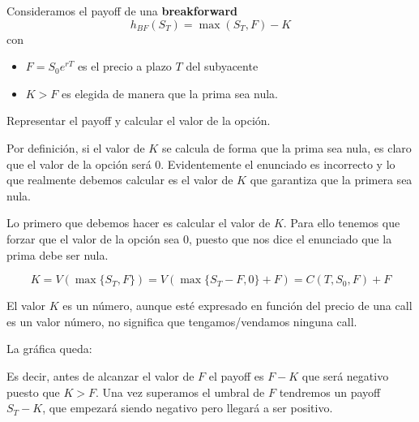 \begin{problem}[4]
Consideramos el payoff de una \textbf{breakforward}
\[h_{BF}(S_T) = \max(S_T,F)-K\]
con
\begin{itemize}
\item $F=S_0e^{rT}$ es el precio a plazo $T$ del subyacente
\item $K>F$ es elegida de manera que la prima sea nula.
\end{itemize}

Representar el payoff y calcular el valor de la opción.

\solution
{}

Por definición, si el valor de $K$ se calcula de forma que la prima sea nula, es claro que el valor de la opción será 0. Evidentemente el enunciado es incorrecto y lo que realmente debemos calcular es el valor de $K$ que garantiza que la primera sea nula.

Lo primero que debemos hacer es calcular el valor de $K$. Para ello tenemos que forzar que el valor de la opción sea 0, puesto que nos dice el enunciado que la prima debe ser nula.

\[K = V(\max\{S_T,F\}) = V(\max\{S_T-F,0\}+F) = C(T,S_0,F)+F\]

El valor $K$ es un número, aunque esté expresado en función del precio de una call es un valor número, no significa que tengamos/vendamos ninguna call.

La gráfica queda:
\begin{center}
\end{center}

Es decir, antes de alcanzar el valor de $F$ el payoff es $F-K$ que será negativo puesto que $K>F$. Una vez superamos el umbral de $F$ tendremos un payoff $S_T-K$, que empezará siendo negativo pero llegará a ser positivo.

\end{problem}

